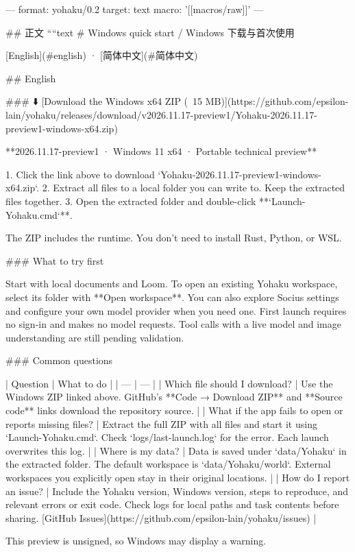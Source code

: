 ---
format: yohaku/0.2
target: text
macro: '[[macros/raw]]'
---

## 正文
````text
# Windows quick start / Windows 下载与首次使用

[English](#english) · [简体中文](#简体中文)

## English

### ⬇️ [Download the Windows x64 ZIP (~15 MB)](https://github.com/epsilon-lain/yohaku/releases/download/v2026.11.17-preview1/Yohaku-2026.11.17-preview1-windows-x64.zip)

**2026.11.17-preview1 · Windows 11 x64 · Portable technical preview**

1. Click the link above to download `Yohaku-2026.11.17-preview1-windows-x64.zip`.
2. Extract all files to a local folder you can write to. Keep the extracted files together.
3. Open the extracted folder and double-click **`Launch-Yohaku.cmd`**.

The ZIP includes the runtime. You don’t need to install Rust, Python, or WSL.

### What to try first

Start with local documents and Loom. To open an existing Yohaku workspace, select its folder with **Open workspace**.
You can also explore Socius settings and configure your own model provider when you need one. First launch requires no sign-in and makes no model requests.
Tool calls with a live model and image understanding are still pending validation.

### Common questions

| Question | What to do |
| --- | --- |
| Which file should I download? | Use the Windows ZIP linked above. GitHub’s **Code → Download ZIP** and **Source code** links download the repository source. |
| What if the app fails to open or reports missing files? | Extract the full ZIP with all files and start it using `Launch-Yohaku.cmd`. Check `logs/last-launch.log` for the error. Each launch overwrites this log. |
| Where is my data? | Data is saved under `data/Yohaku` in the extracted folder. The default workspace is `data/Yohaku/world`. External workspaces you explicitly open stay in their original locations. |
| How do I report an issue? | Include the Yohaku version, Windows version, steps to reproduce, and relevant errors or exit code. Check logs for local paths and task contents before sharing. [GitHub Issues](https://github.com/epsilon-lain/yohaku/issues) |

This preview is unsigned, so Windows may display a warning.

